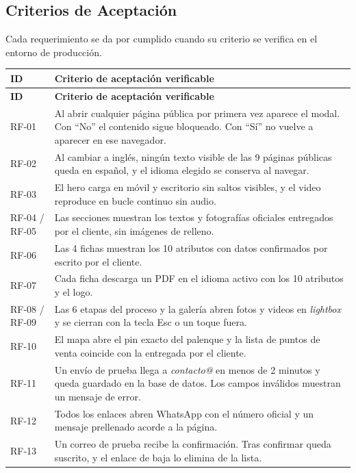 \documentclass[11pt,letterpaper]{article}
\begin{document}
\subsection{Criterios de Aceptación}
Cada requerimiento se da por cumplido cuando su criterio se verifica en el entorno de producción.

\renewcommand{\arraystretch}{1.3}
\small
\begin{longtable}{@{} L{1.9cm} L{13.9cm} @{}}
\toprule
\textbf{ID} & \textbf{Criterio de aceptación verificable} \\
\midrule
\endfirsthead
\toprule
\textbf{ID} & \textbf{Criterio de aceptación verificable} \\
\midrule
\endhead
\bottomrule
\endfoot
RF-01 & Al abrir cualquier página pública por primera vez aparece el modal. Con ``No'' el contenido sigue bloqueado. Con ``Sí'' no vuelve a aparecer en ese navegador. \\
RF-02 & Al cambiar a inglés, ningún texto visible de las 9 páginas públicas queda en español, y el idioma elegido se conserva al navegar. \\
RF-03 & El hero carga en móvil y escritorio sin saltos visibles, y el video reproduce en bucle continuo sin audio. \\
RF-04 / RF-05 & Las secciones muestran los textos y fotografías oficiales entregados por el cliente, sin imágenes de relleno. \\
RF-06 & Las 4 fichas muestran los 10 atributos con datos confirmados por escrito por el cliente. \\
RF-07 & Cada ficha descarga un PDF en el idioma activo con los 10 atributos y el logo. \\
RF-08 / RF-09 & Las 6 etapas del proceso y la galería abren fotos y videos en \textit{lightbox} y se cierran con la tecla Esc o un toque fuera. \\
RF-10 & El mapa abre el pin exacto del palenque y la lista de puntos de venta coincide con la entregada por el cliente. \\
RF-11 & Un envío de prueba llega a \textit{contacto@} en menos de 2 minutos y queda guardado en la base de datos. Los campos inválidos muestran un mensaje de error. \\
RF-12 & Todos los enlaces abren WhatsApp con el número oficial y un mensaje prellenado acorde a la página. \\
RF-13 & Un correo de prueba recibe la confirmación. Tras confirmar queda suscrito, y el enlace de baja lo elimina de la lista. \\

\end{longtable}
\end{document}
